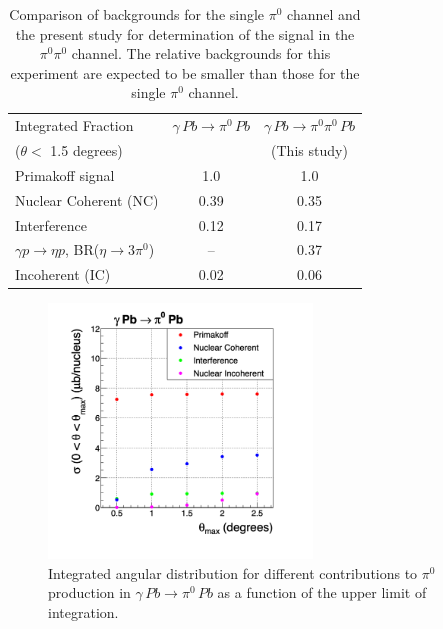 \begin{table}[t]
\caption{Comparison of backgrounds for the single $\pi^0$ channel and the present study for 
determination of the signal in the $\pi^0\pi^0$ channel. The relative backgrounds for this experiment
are expected to be smaller than those for the single $\pi^0$ channel.
\label{tab:Primex_sigmas}
}
\begin{center}
\begin{tabular}{|l|c|c|}
\hline
\hline 
 Integrated Fraction & $\gamma\,Pb\to \pi^0\, Pb$  & $\gamma\,Pb\to \pi^0\pi^0\, Pb$ \\  
  ($\theta <$ 1.5 degrees)                    &       & (This study) \\  \hline
  Primakoff signal  &   1.0   & 1.0   \\ \hline 
  Nuclear Coherent (NC)  & 0.39  &   0.35   \\ \hline 
  Interference  & 0.12  &  0.17   \\ \hline 
  $\gamma p \rightarrow \eta p$, BR($\eta \rightarrow 3\pi^0$)  &   -- & 0.37   \\ \hline 
  Incoherent (IC)  &   0.02  & 0.06  \\
  \hline   
  \hline
\end{tabular}
\end{center}
\end{table}





\begin{figure}[tbp]
\begin{center}
\includegraphics[width=7cm,angle=0]{figures/Primex_sigmas_c1.png}
\end{center}
\caption{Integrated angular distribution for different contributions to $\pi^0$ production in $\gamma\,Pb\rightarrow\pi^0\,Pb$ as a function of the upper limit of integration.}
\label{fig:Primex_sigmas_c1}
\end{figure}


